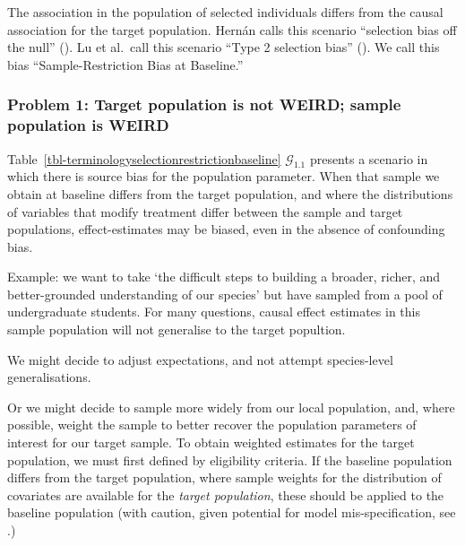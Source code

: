 \documentclass[
  single column]{article}
\begin{document}
\begin{table}

\caption{\label{tbl-terminologyselectionrestrictionbaseline}The
association in the population of selected individuals differs from the
causal association for the target population. Hernán calls this scenario
``selection bias off the null'' (). Lu et al.~call this scenario ``Type 2 selection bias''
(). We call this bias
``Sample-Restriction Bias at Baseline.''}

\centering{

\terminologyselectionrestrictionbaseline

}

\end{table}%

\subsubsection{Problem 1: Target population is not WEIRD; sample
population is
WEIRD}\label{problem-1-target-population-is-not-weird-sample-population-is-weird}

Table~\ref{tbl-terminologyselectionrestrictionbaseline}
\(\mathcal{G}_{1.1}\) presents a scenario in which there is source bias
for the population parameter. When that sample we obtain at baseline
differs from the target population, and where the distributions of
variables that modify treatment differ between the sample and target
populations, effect-estimates may be biased, even in the absence of
confounding bias.

Example: we want to take `the difficult steps to building a broader,
richer, and better-grounded understanding of our species' but have
sampled from a pool of undergraduate students. For many questions,
causal effect estimates in this sample population will not generalise to
the target popultion.

We might decide to adjust expectations, and not attempt species-level
generalisations.

Or we might decide to sample more widely from our local population, and,
where possible, weight the sample to better recover the population
parameters of interest for our target sample. To obtain weighted
estimates for the target population, we must first defined by
eligibility criteria. If the baseline population differs from the target
population, where sample weights for the distribution of covariates are
available for the \emph{target population}, these should be applied to
the baseline population (with caution, given potential for model
mis-specification, see .)
\end{document}
